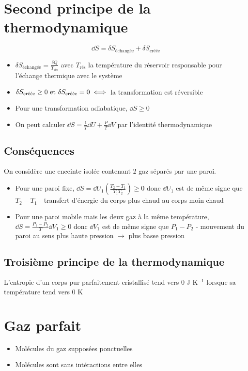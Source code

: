 \documentclass[openany]{book}
\begin{document}
\section{Second principe de la thermodynamique}
\[ \dd S = \delta S_{\text{échangée}} + \delta S_{\text{créée}} \]

\begin{itemize}
    \item $\delta S_{\text{échangée}} = \frac{\delta Q}{T_{\text{rés}}}$ avec $T_{\text{rés}}$ la température du réservoir responsable pour l'échange thermique avec le système
    \item $\delta S_{\text{créée}} \geq 0 \text{ et } \delta S_{\text{créée}}= 0 \iff $ la transformation est réversible
    \item Pour une transformation adiabatique, $\dd S \geq 0$
    \item On peut calculer $\dd S = \frac{1}{T}\dd U + \frac{P}{T} \dd V$ par l'identité thermodynamique
\end{itemize}

\subsection{Conséquences}
On considère une enceinte isolée contenant 2 gaz séparés par une paroi. 
\begin{itemize}
    \item Pour une paroi fixe, $\dd S = \dd U_1 (\frac{T_2 - T_1}{T_1 T_2}) \geq 0$ donc $\dd U_1$ est de même signe que $T_2 - T_1$ - transfert d'énergie du corps plus chaud au corps moin chaud
    \item Pour une paroi mobile mais les deux gaz à la même température, $\dd S = \frac{P_1 - P_2}{T} \dd V_1 \geq 0$ donc $\dd V_1$ est de même signe que $P_1 - P_2$ - mouvement du paroi au sens plus haute pression $\rightarrow$ plus basse pression
\end{itemize}

\subsection{Troisième principe de la thermodynamique}

L'entropie d'un corps pur parfaitement cristallisé tend vers 0 J K$^{-1}$ lorsque sa température tend vers $0$ K

\section{Gaz parfait}
\begin{itemize}
    \item Molécules du gaz supposées ponctuelles
    \item Molécules sont sans intéractions entre elles
\end{itemize}
\end{document}
